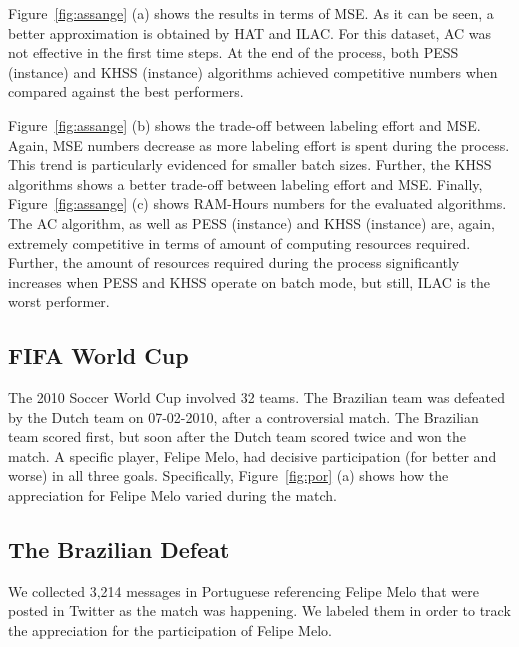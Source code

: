 Figure~\ref{fig:assange} (a) shows the results in terms of MSE.
As it can be seen, a better approximation is obtained by HAT and ILAC.
For this dataset, AC was not effective in the first
time steps. At the end of the process, both PESS (instance) and KHSS (instance) algorithms achieved competitive numbers when compared against the best performers.

Figure~\ref{fig:assange} (b) shows the trade-off between labeling effort and MSE. Again, MSE numbers decrease as more labeling effort is spent during the process. This trend is particularly evidenced for smaller batch sizes. Further, the KHSS algorithms shows a better trade-off between labeling effort and MSE.
Finally, Figure~\ref{fig:assange} (c)
shows RAM-Hours numbers for the evaluated algorithms. The AC algorithm, as well as PESS (instance) and KHSS (instance) are, again, extremely competitive in terms of amount of computing resources required. Further, the amount of resources required during the process significantly increases when PESS and KHSS operate on batch mode, but still, ILAC is the worst performer.

\subsection{FIFA World Cup}

The 2010 Soccer World Cup involved 32 teams. The Brazilian team was defeated by the Dutch team on 07-02-2010, after a controversial match. The Brazilian team scored first, but soon after the Dutch team scored twice and won the match. A specific player, Felipe Melo, had decisive participation (for better and worse) in all three goals. Specifically, Figure~\ref{fig:por} (a) shows how the appreciation for Felipe Melo varied during the match.

\subsection*{The Brazilian Defeat}
We collected 3,214 messages in Portuguese referencing Felipe Melo that were posted in Twitter as the match was happening.
We labeled them in order to track the
appreciation for the participation of Felipe Melo.

